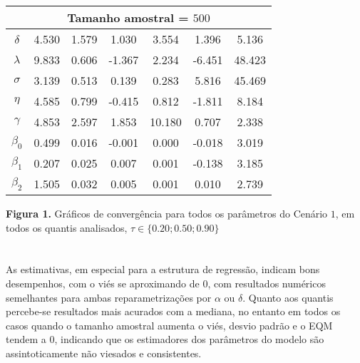 \documentclass{sciposter}
\begin{document}
\begin{multicols}{3}
{\begin{table}[H]
\begin{tabular}[t]{c|c|c|c|c|c|c}
\hline
\multicolumn{7}{c}{Tamanho amostral = $500$} \\
\hline
$\delta$ & 4.530 & 1.579 & 1.030 & 3.554 & 1.396 & 5.136\\
$\lambda$ & 9.833 & 0.606 & -1.367 & 2.234 & -6.451 & 48.423\\
$\sigma$ & 3.139 & 0.513 & 0.139 & 0.283 & 5.816 & 45.469\\
$\eta$ & 4.585 & 0.799 & -0.415 & 0.812 & -1.811 & 8.184\\
$\gamma$ & 4.853 & 2.597 & 1.853 & 10.180 & 0.707 & 2.338\\
$\beta_0$ & 0.499 & 0.016 & -0.001 & 0.000 & -0.018 & 3.019\\
$\beta_1$ & 0.207 & 0.025 & 0.007 & 0.001 & -0.138 & 3.185\\
$\beta_2$ & 1.505 & 0.032 & 0.005 & 0.001 & 0.010 & 2.739\\
\hline
\end{tabular}
\end{table}

\vspace{0.5cm}

\textbf{Figura 1.} Gráficos de convergência para todos os parâmetros do Cenário $1$, em todos os quantis analisados, $\tau \in \{0.20; 0.50; 0.90\}$}

\begin{figure}[h!]
\begin{center}
\end{center}
\end{figure}


\section*{}
\vspace{0.2cm}

As estimativas, em especial para a estrutura de regressão, indicam bons desempenhos, com o viés se aproximando de $0$, com resultados numéricos semelhantes para ambas reparametrizações por $\alpha$ ou $\delta$. Quanto aos quantis percebe-se resultados mais acurados com a mediana, no entanto em todos os casos quando o tamanho amostral aumenta o viés, desvio padrão e o EQM tendem a $0$, indicando que os estimadores dos parâmetros do modelo são assintoticamente não viesados e consistentes.


\end{multicols}
\end{document}
